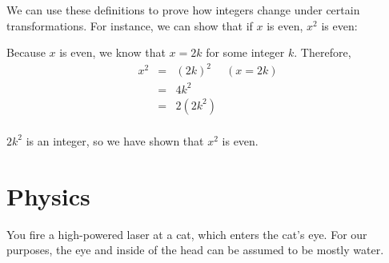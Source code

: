 \documentclass[11pt]{exam}
\def\QED{\ensuremath{{\square}}}
\def\markatright#1{\leavevmode\unskip\nobreak\quad\hspace*{\fill}{#1}}
\newenvironment{proof}
  {\begin{trivlist}\item[\hskip\labelsep{\bf Proof.}]}
  {\markatright{\QED}\end{trivlist}}
\begin{document}
\begin{questions}
We can use these definitions to prove how integers change under certain
transformations. For instance, we can show that if $x$ is even, $x^2$ is even:

\begin{proof}
Because $x$ is even, we know that $x = 2k$ for some integer $k$. Therefore,
\[\begin{array}{rclr}
x^2 &=& (2k)^2 & (x = 2k) \\
&=& 4k^2 & \\
&=& 2(2k^2) & \\
\end{array}\]

$2k^2$ is an integer, so we have shown that $x^2$ is even.
\end{proof}









\newpage
\section{Physics}
\setcounter{question}{0}

\question You fire a high-powered laser at a cat, which enters the cat's
eye. For our purposes, the eye and inside of the head can be assumed to be mostly
water.









\end{questions}
\end{document}
